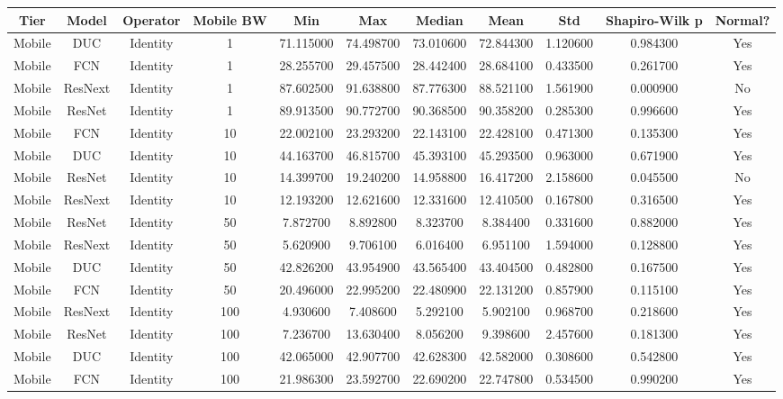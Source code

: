 \begin{tabular}{|c||c||c||c||c||c||c||c||c||c||c|}
\toprule
Tier & Model & Operator & Mobile BW & Min & Max & Median & Mean & Std & Shapiro-Wilk p & Normal? \\
\midrule
Mobile & DUC & Identity & 1 & 71.115000 & 74.498700 & 73.010600 & 72.844300 & 1.120600 & 0.984300 & Yes \\
Mobile & FCN & Identity & 1 & 28.255700 & 29.457500 & 28.442400 & 28.684100 & 0.433500 & 0.261700 & Yes \\
Mobile & ResNext & Identity & 1 & 87.602500 & 91.638800 & 87.776300 & 88.521100 & 1.561900 & 0.000900 & No \\
Mobile & ResNet & Identity & 1 & 89.913500 & 90.772700 & 90.368500 & 90.358200 & 0.285300 & 0.996600 & Yes \\
Mobile & FCN & Identity & 10 & 22.002100 & 23.293200 & 22.143100 & 22.428100 & 0.471300 & 0.135300 & Yes \\
Mobile & DUC & Identity & 10 & 44.163700 & 46.815700 & 45.393100 & 45.293500 & 0.963000 & 0.671900 & Yes \\
Mobile & ResNet & Identity & 10 & 14.399700 & 19.240200 & 14.958800 & 16.417200 & 2.158600 & 0.045500 & No \\
Mobile & ResNext & Identity & 10 & 12.193200 & 12.621600 & 12.331600 & 12.410500 & 0.167800 & 0.316500 & Yes \\
Mobile & ResNet & Identity & 50 & 7.872700 & 8.892800 & 8.323700 & 8.384400 & 0.331600 & 0.882000 & Yes \\
Mobile & ResNext & Identity & 50 & 5.620900 & 9.706100 & 6.016400 & 6.951100 & 1.594000 & 0.128800 & Yes \\
Mobile & DUC & Identity & 50 & 42.826200 & 43.954900 & 43.565400 & 43.404500 & 0.482800 & 0.167500 & Yes \\
Mobile & FCN & Identity & 50 & 20.496000 & 22.995200 & 22.480900 & 22.131200 & 0.857900 & 0.115100 & Yes \\
Mobile & ResNext & Identity & 100 & 4.930600 & 7.408600 & 5.292100 & 5.902100 & 0.968700 & 0.218600 & Yes \\
Mobile & ResNet & Identity & 100 & 7.236700 & 13.630400 & 8.056200 & 9.398600 & 2.457600 & 0.181300 & Yes \\
Mobile & DUC & Identity & 100 & 42.065000 & 42.907700 & 42.628300 & 42.582000 & 0.308600 & 0.542800 & Yes \\
Mobile & FCN & Identity & 100 & 21.986300 & 23.592700 & 22.690200 & 22.747800 & 0.534500 & 0.990200 & Yes \\

\end{tabular}
